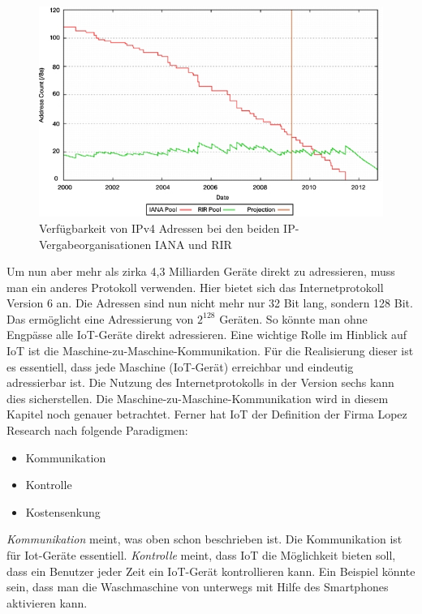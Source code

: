 \begin{figure}
\includegraphics[scale=0.7]{bilder/ipv4cisco} 
\caption[Verfügbarkeit von IPv4 Adressen bei den beiden IP-Vergabeorganisationen IANA und RIR ]{Verfügbarkeit von IPv4 Adressen bei den beiden IP-Vergabeorganisationen IANA und RIR \cite{cisco}}
\label{IPv4}
\end{figure}


Um nun aber mehr als zirka 4,3 Milliarden Geräte direkt zu adressieren, muss man ein anderes Protokoll verwenden. Hier bietet sich das Internetprotokoll Version 6 an. Die Adressen sind nun nicht mehr nur 32 Bit lang, sondern 128 Bit. Das ermöglicht eine Adressierung von $2^{128}$ Geräten. So könnte man ohne Engpässe alle IoT-Geräte direkt adressieren. 
Eine wichtige Rolle im Hinblick auf IoT ist die Maschine-zu-Maschine-Kommunikation. Für die Realisierung dieser ist es essentiell, dass jede Maschine (IoT-Gerät) erreichbar und eindeutig adressierbar ist. Die Nutzung des Internetprotokolls in der Version sechs kann dies sicherstellen. Die Maschine-zu-Maschine-Kommunikation wird in diesem Kapitel noch genauer betrachtet.     
Ferner hat IoT der Definition der Firma Lopez Research nach folgende Paradigmen:
\begin{itemize}
\item Kommunikation
\item Kontrolle
\item Kostensenkung
\end{itemize} 
\textit{Kommunikation} meint, was oben schon beschrieben ist. Die Kommunikation ist für Iot-Geräte essentiell. \textit{Kontrolle} meint, dass IoT die Möglichkeit bieten soll, dass ein Benutzer jeder Zeit ein IoT-Gerät kontrollieren kann. Ein Beispiel könnte sein, dass man die Waschmaschine von unterwegs mit Hilfe des Smartphones aktivieren kann. 

\cite{cisco}
